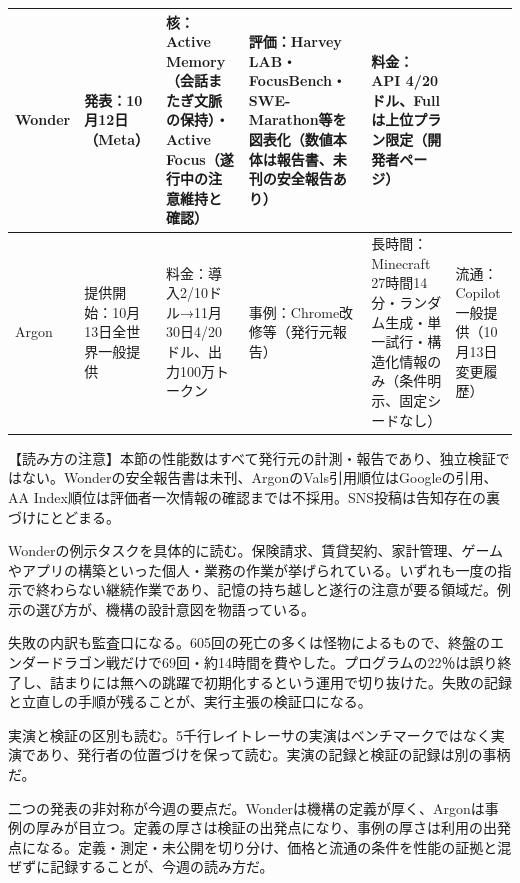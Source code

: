 \documentclass[lualatex,a4paper,10pt]{jlreq}
\begin{document}
\begin{strip} %
\centering\footnotesize
{}
\begin{tabularx}{0.96\linewidth}{@{}lXXXXX@{}}
\toprule
Wonder & 発表：10月12日（Meta） & 核：Active Memory（会話またぎ文脈の保持）・Active Focus（遂行中の注意維持と確認） & 評価：Harvey LAB・FocusBench・SWE-Marathon等を図表化（数値本体は報告書、未刊の安全報告あり） & 料金：API 4/20ドル、Fullは上位プラン限定（開発者ページ） \cite{B01,B62,B63,B02} \\
\midrule
Argon & 提供開始：10月13日全世界一般提供 & 料金：導入2/10ドル→11月30日4/20ドル、出力100万トークン & 事例：Chrome改修等（発行元報告） & 長時間：Minecraft 27時間14分・ランダム生成・単一試行・構造化情報のみ（条件明示、固定シードなし） & 流通：Copilot一般提供（10月13日変更履歴） \cite{B05,B65,B08,B04} \\
\bottomrule
\end{tabularx}
\end{strip} %

\begin{tcolorbox}[colback=SurveySoft,colframe=SurveyRule,arc=1mm,boxrule=0.4pt,left=2mm,right=2mm]
【読み方の注意】本節の性能数はすべて発行元の計測・報告であり、独立検証ではない。Wonderの安全報告書は未刊、ArgonのVals引用順位はGoogleの引用、AA Index順位は評価者一次情報の確認までは不採用。SNS投稿は告知存在の裏づけにとどまる。
\end{tcolorbox}
\cite{B01,B62,B63,B02,B64,B03,B05,B65,B08,B04,B07,B06}

Wonderの例示タスクを具体的に読む。保険請求、賃貸契約、家計管理、ゲームやアプリの構築といった個人・業務の作業が挙げられている。いずれも一度の指示で終わらない継続作業であり、記憶の持ち越しと遂行の注意が要る領域だ。例示の選び方が、機構の設計意図を物語っている。
\cite{B01,B62,B63,B02,B64,B03}


失敗の内訳も監査口になる。605回の死亡の多くは怪物によるもので、終盤のエンダードラゴン戦だけで69回・約14時間を費やした。プログラムの22％は誤り終了し、詰まりには無への跳躍で初期化するという運用で切り抜けた。失敗の記録と立直しの手順が残ることが、実行主張の検証口になる。
\cite{B05,B65,B08,B04,B07,B06}


実演と検証の区別も読む。5千行レイトレーサの実演はベンチマークではなく実演であり、発行者の位置づけを保って読む。実演の記録と検証の記録は別の事柄だ。
\cite{B05,B65,B08,B04,B07,B06}


二つの発表の非対称が今週の要点だ。Wonderは機構の定義が厚く、Argonは事例の厚みが目立つ。定義の厚さは検証の出発点になり、事例の厚さは利用の出発点になる。定義・測定・未公開を切り分け、価格と流通の条件を性能の証拠と混ぜずに記録することが、今週の読み方だ。
\cite{B01,B62,B63,B02,B64,B03,B05,B65,B08,B04,B07,B06}
\end{document}
